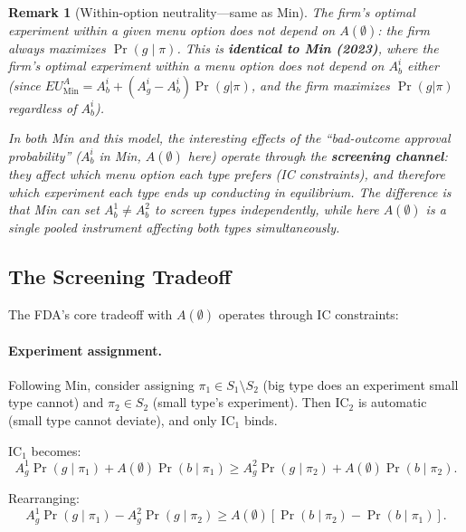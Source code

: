 \documentclass[12pt,a4paper]{article}
\newtheorem{remark}{Remark}
\begin{document}
\begin{remark}[Within-option neutrality---same as Min]
The firm's optimal experiment within a given menu option does
not depend on $A(\emptyset)$: the firm always maximizes
$\Pr(g \mid \pi)$. This is \textbf{identical to Min (2023)},
where the firm's optimal experiment within a menu option does
not depend on $A_b^i$ either (since
$EU^A_{\text{Min}} = A_b^i + (A_g^i - A_b^i) \Pr(g|\pi)$,
and the firm maximizes $\Pr(g|\pi)$ regardless of $A_b^i$).

In both Min and this model, the interesting effects of the
``bad-outcome approval probability'' ($A_b^i$ in Min,
$A(\emptyset)$ here) operate through the
\textbf{screening channel}: they affect which menu option each
type prefers (IC constraints), and therefore which experiment
each type ends up conducting in equilibrium. The difference is
that Min can set $A_b^1 \neq A_b^2$ to screen types
independently, while here $A(\emptyset)$ is a single pooled
instrument affecting both types simultaneously.
\end{remark}


\subsection{The Screening Tradeoff}
\label{sec:screening_tradeoff}

The FDA's core tradeoff with $A(\emptyset)$ operates through
IC constraints:

\paragraph{Experiment assignment.}
Following Min, consider assigning $\pi_1 \in S_1 \setminus S_2$
(big type does an experiment small type cannot) and
$\pi_2 \in S_2$ (small type's experiment). Then IC$_2$ is
automatic (small type cannot deviate), and only IC$_1$ binds.

IC$_1$ becomes:
\begin{equation}\label{eq:IC1_expanded}
  A_g^1 \Pr(g \mid \pi_1) + A(\emptyset) \Pr(b \mid \pi_1)
  \geq
  A_g^2 \Pr(g \mid \pi_2) + A(\emptyset) \Pr(b \mid \pi_2).
\end{equation}

Rearranging:
\begin{equation}\label{eq:IC1_rearranged}
  A_g^1 \Pr(g \mid \pi_1) - A_g^2 \Pr(g \mid \pi_2)
  \geq A(\emptyset) \left[\Pr(b \mid \pi_2)
    - \Pr(b \mid \pi_1)\right].
\end{equation}
\end{document}
